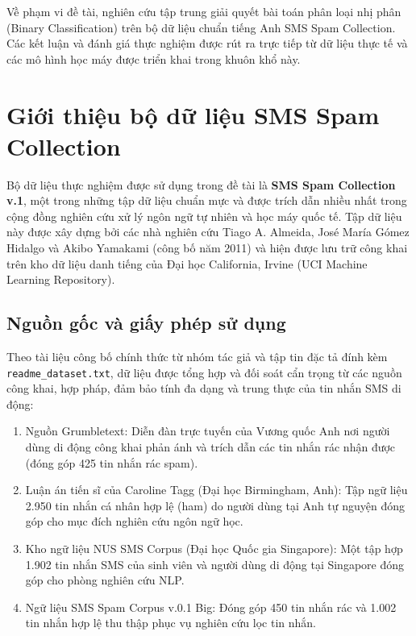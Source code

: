 Về phạm vi đề tài, nghiên cứu tập trung giải quyết bài toán phân loại nhị phân (Binary Classification) trên bộ dữ liệu chuẩn tiếng Anh SMS Spam Collection. Các kết luận và đánh giá thực nghiệm được rút ra trực tiếp từ dữ liệu thực tế và các mô hình học máy được triển khai trong khuôn khổ này.

\section{Giới thiệu bộ dữ liệu SMS Spam Collection}
\label{sec:dataset}

Bộ dữ liệu thực nghiệm được sử dụng trong đề tài là \textbf{SMS Spam Collection v.1}, một trong những tập dữ liệu chuẩn mực và được trích dẫn nhiều nhất trong cộng đồng nghiên cứu xử lý ngôn ngữ tự nhiên và học máy quốc tế. Tập dữ liệu này được xây dựng bởi các nhà nghiên cứu Tiago A. Almeida, José María Gómez Hidalgo và Akibo Yamakami (công bố năm 2011) và hiện được lưu trữ công khai trên kho dữ liệu danh tiếng của Đại học California, Irvine (UCI Machine Learning Repository).

\subsection{Nguồn gốc và giấy phép sử dụng}
Theo tài liệu công bố chính thức từ nhóm tác giả và tập tin đặc tả đính kèm \texttt{readme\_dataset.txt}, dữ liệu được tổng hợp và đối soát cẩn trọng từ các nguồn công khai, hợp pháp, đảm bảo tính đa dạng và trung thực của tin nhắn SMS di động:
\begin{enumerate}
    \item Nguồn Grumbletext: Diễn đàn trực tuyến của Vương quốc Anh nơi người dùng di động công khai phản ánh và trích dẫn các tin nhắn rác nhận được (đóng góp 425 tin nhắn rác spam).
    \item Luận án tiến sĩ của Caroline Tagg (Đại học Birmingham, Anh): Tập ngữ liệu 2.950 tin nhắn cá nhân hợp lệ (ham) do người dùng tại Anh tự nguyện đóng góp cho mục đích nghiên cứu ngôn ngữ học.
    \item Kho ngữ liệu NUS SMS Corpus (Đại học Quốc gia Singapore): Một tập hợp 1.902 tin nhắn SMS của sinh viên và người dùng di động tại Singapore đóng góp cho phòng nghiên cứu NLP.
    \item Ngữ liệu SMS Spam Corpus v.0.1 Big: Đóng góp 450 tin nhắn rác và 1.002 tin nhắn hợp lệ thu thập phục vụ nghiên cứu lọc tin nhắn.
\end{enumerate}

